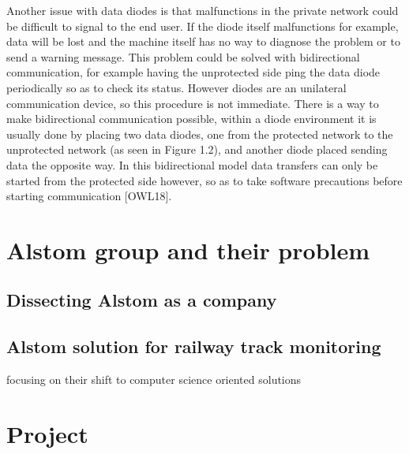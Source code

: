 \documentclass[a4paper, 12pt]{book}
\begin{document}
Another issue with data diodes is that malfunctions in the private network could be difficult to signal to the end user. If the diode itself malfunctions for example, data will be lost and the machine itself has no way to diagnose the problem or to send a warning message. This problem could be solved with bidirectional communication, for example having the unprotected side ping the data diode periodically so as to check its status. However diodes are an unilateral communication device, so this procedure is not immediate. There is a way to make bidirectional communication possible, within a diode environment it is usually done by placing two data diodes, one from the protected network to the unprotected network (as seen in Figure 1.2), and another diode placed sending data the opposite way. In this bidirectional model data transfers can only be started from the protected side however, so as to take software precautions before starting communication [OWL18].




\chapter{Alstom group and their problem}

\section{Dissecting Alstom as a company}
\section{Alstom solution for railway track monitoring}
focusing on their shift to computer science oriented solutions

\chapter{Project}
\end{document}
